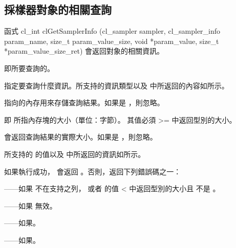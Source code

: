 \subsection{採樣器對象的相關查詢}

函式
\startclc
cl_int clGetSamplerInfo (cl_sampler sampler,
			cl_sampler_info param_name,
			size_t param_value_size,
			void *param_value,
			size_t *param_value_size_ret)
\stopclc
會返回對象的相關資訊。

 即所要查詢的。

 指定要查詢什麼資訊。所支持的資訊類型以及  中所返回的內容如所示。

 指向的內存用來存儲查詢結果。如果是 ，則忽略。

 即  所指內存塊的大小（單位：字節）。
其值必須 >= 中返回型別的大小。

 會返回查詢結果的實際大小。如果是 ，則忽略。

 所支持的  的值以及  中所返回的資訊如所示。

{}

如果執行成功， 會返回 。否則，返回下列錯誤碼之一：
\startigBase
\item {}——如果  不在支持之列，
  或者  的值 < 中返回型別的大小且  不是 。
\item {}——如果  無效。
\item {}——如果\scdevfailres。
\item {}——如果\schostfailres。
\stopigBase

